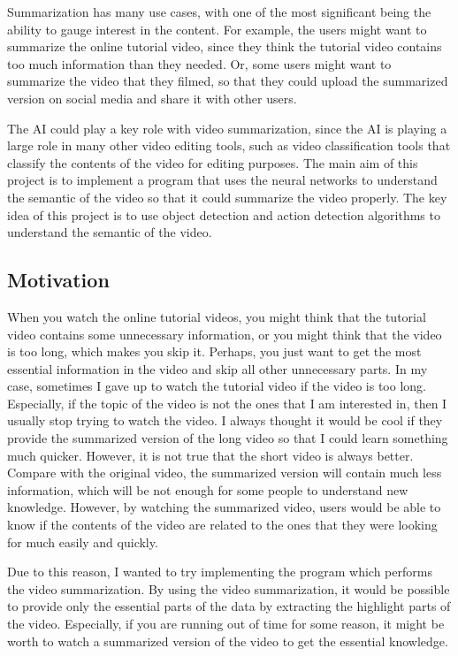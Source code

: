 \documentclass{article}
\begin{document}
Summarization has many use cases, with one of the most significant being the ability to gauge interest in the content. For example, the users might want to summarize the online tutorial video, since they think the tutorial video contains too much information than they needed. Or, some users might want to summarize the video that they filmed, so that they could upload the summarized version on social media and share it with other users.

The AI could play a key role with video summarization, since the AI is playing a large role in many other video editing tools, such as video classification tools that classify the contents of the video for editing purposes. The main aim of this project is to implement a program that uses the neural networks to understand the semantic of the video so that it could summarize the video properly. The key idea of this project is to use object detection and action detection algorithms to understand the semantic of the video.


\subsection{Motivation}

When you watch the online tutorial videos, you might think that the tutorial video contains some unnecessary information, or you might think that the video is too long, which makes you skip it. Perhaps, you just want to get the most essential information in the video and skip all other unnecessary parts. In my case, sometimes I gave up to watch the tutorial video if the video is too long. Especially, if the topic of the video is not the ones that I am interested in, then I usually stop trying to watch the video. I always thought it would be cool if they provide the summarized version of the long video so that I could learn something much quicker. However, it is not true that the short video is always better. Compare with the original video, the summarized version will contain much less information, which will be not enough for some people to understand new knowledge. However, by watching the summarized video, users would be able to know if the contents of the video are related to the ones that they were looking for much easily and quickly.

Due to this reason, I wanted to try implementing the program which performs the video summarization. By using the video summarization, it would be possible to provide only the essential parts of the data by extracting the highlight parts of the video. Especially, if you are running out of time for some reason, it might be worth to watch a summarized version of the video to get the essential knowledge.
\end{document}

